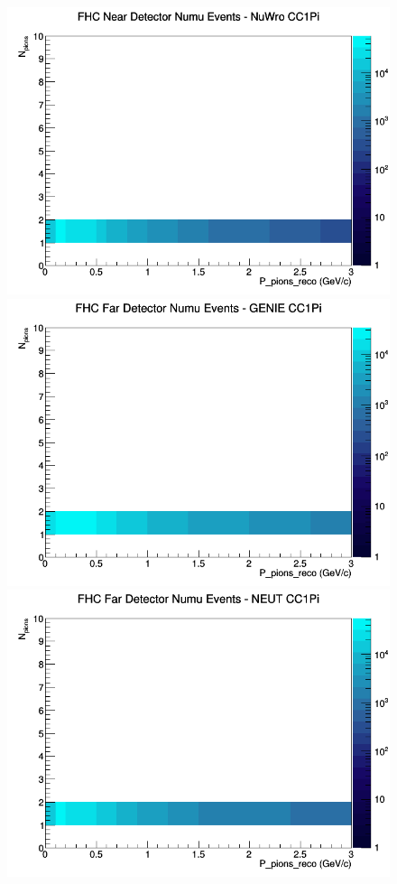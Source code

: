 \documentclass[12pt]{article}
\begin{document}
\begin{figure}[h]
\includegraphics[width=\linewidth]{eff_N_P/LAr/pions/CC1Pi_FHC_ND_numu_N_P_NuWro.png}
\endminipage
\newline
{}
\includegraphics[width=\linewidth]{eff_N_P/LAr/pions/CC1Pi_FHC_FD_numu_N_P_GENIE.png}
\endminipage
{}
\includegraphics[width=\linewidth]{eff_N_P/LAr/pions/CC1Pi_FHC_FD_numu_N_P_NEUT.png}

\end{figure}
\end{document}
